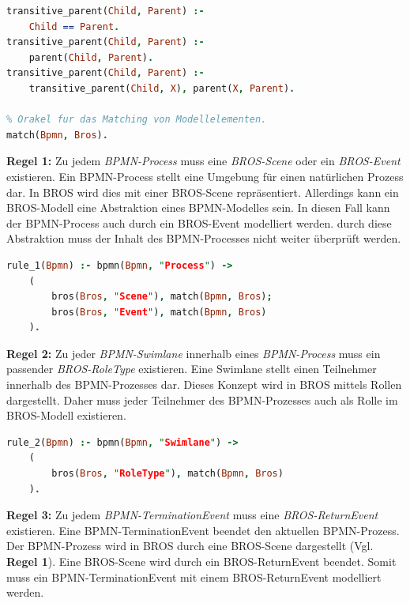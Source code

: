 \begin{lstlisting}[language=Prolog, caption=Definitionen der weiterführenden Regeln, label=lst:definition_predicats]
% Transitiver Abschluss der Modellstruktur.
transitive_parent(Child, Parent) :- 
    Child == Parent.
transitive_parent(Child, Parent) :- 
    parent(Child, Parent).
transitive_parent(Child, Parent) :- 
    transitive_parent(Child, X), parent(X, Parent).

% Orakel fur das Matching von Modellelementen.
match(Bpmn, Bros).
\end{lstlisting}

\textbf{Regel 1:} Zu jedem \emph{BPMN-Process} muss eine \emph{BROS-Scene} oder ein \emph{BROS-Event} existieren.
Ein BPMN-Process stellt eine Umgebung für einen natürlichen Prozess dar.
In BROS wird dies mit einer BROS-Scene repräsentiert.
Allerdings kann ein BROS-Modell eine Abstraktion eines BPMN-Modelles sein.
In diesen Fall kann der BPMN-Process auch durch ein BROS-Event modelliert werden.
durch diese Abstraktion muss der Inhalt des BPMN-Processes nicht weiter überprüft werden.

\begin{lstlisting}[language=Prolog, caption=Regel 1]
rule_1(Bpmn) :- bpmn(Bpmn, "Process") ->
    (
        bros(Bros, "Scene"), match(Bpmn, Bros);
        bros(Bros, "Event"), match(Bpmn, Bros)
    ).
\end{lstlisting}

\textbf{Regel 2:} Zu jeder \emph{BPMN-Swimlane} innerhalb eines \emph{BPMN-Process} muss ein passender \emph{BROS-RoleType} existieren.
Eine Swimlane stellt einen Teilnehmer innerhalb des BPMN-Prozesses dar. 
Dieses Konzept wird in BROS mittels Rollen dargestellt.
Daher muss jeder Teilnehmer des BPMN-Prozesses auch als Rolle im BROS-Modell existieren.

\begin{lstlisting}[language=Prolog, caption=Regel 2]
rule_2(Bpmn) :- bpmn(Bpmn, "Swimlane") ->
    (
        bros(Bros, "RoleType"), match(Bpmn, Bros)
    ).
\end{lstlisting}

\textbf{Regel 3:} Zu jedem \emph{BPMN-TerminationEvent} muss eine \emph{BROS-ReturnEvent} existieren.
Eine BPMN-TerminationEvent beendet den aktuellen BPMN-Prozess.
Der BPMN-Prozess wird in BROS durch eine BROS-Scene dargestellt (Vgl. \textbf{Regel 1}).
Eine BROS-Scene wird durch ein BROS-ReturnEvent beendet.
Somit muss ein BPMN-TerminationEvent mit einem BROS-ReturnEvent modelliert werden.

